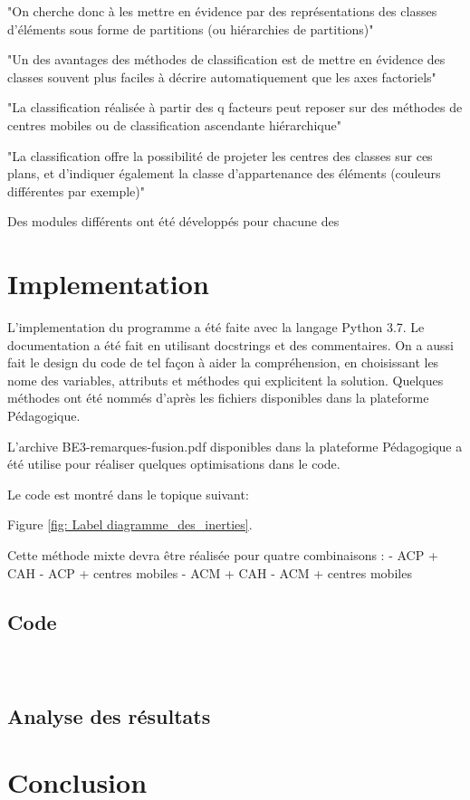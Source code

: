 \documentclass{rapportECL}
\begin{document}
"On cherche donc à les mettre en évidence
par des représentations des classes
d’éléments sous forme de partitions (ou
hiérarchies de partitions)" %

"Un des avantages des méthodes de
classification est de mettre en évidence des
classes souvent plus faciles à décrire
automatiquement que les axes factoriels" %

"La classification réalisée à partir des q facteurs
peut reposer sur des méthodes de centres
mobiles ou de classification ascendante
hiérarchique" %

"La classification offre la possibilité de projeter les centres des 
classes sur ces plans, et d’indiquer également la classe
d’appartenance des éléments (couleurs différentes par exemple)"%


Des modules différents ont été développés pour chacune des 

\section{Implementation}

L'implementation du programme a été faite avec la langage Python 3.7. Le documentation a été fait en utilisant docstrings et des commentaires. On a aussi fait le design du code de tel façon  à aider la compréhension, en choisissant les nome des variables, attributs et méthodes qui explicitent la solution. Quelques méthodes ont été nommés d'après les fichiers disponibles dans la plateforme Pédagogique.

L'archive BE3-remarques-fusion.pdf disponibles dans la plateforme Pédagogique a été utilise pour réaliser quelques optimisations dans le code.

Le code est montré dans le topique suivant:

Figure \ref{fig: Label diagramme_des_inerties}.


Cette méthode mixte devra être réalisée pour quatre combinaisons :
- ACP + CAH
- ACP + centres mobiles
- ACM + CAH
- ACM + centres mobiles

\subsection{Code}

\inputminted[linenos=True]{python}{scr/codage.py}

\inputminted[linenos=True]{python}{scr/acp.py}

\inputminted[linenos=True]{python}{scr/cah.py}

\subsection{Analyse des résultats}

\section{Conclusion}


\newpage

\end{document}
